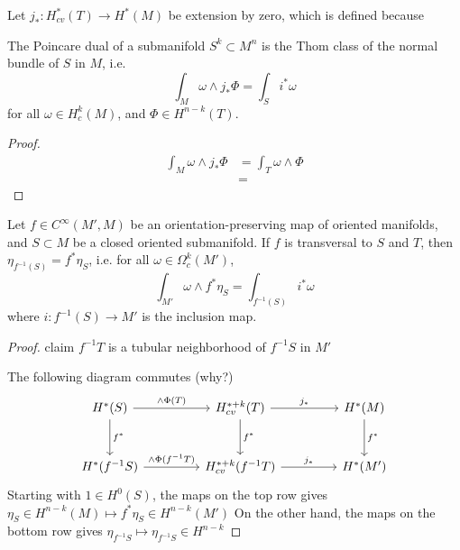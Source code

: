 Let $j_*: H_{cv}^{*}(T) \to H^*(M)$ be extension by zero, which is defined 
because %

\begin{thm} %
	The Poincare dual of a submanifold $S^k \subset M^n$ is the Thom class of the
	normal bundle of $S$ in  $M$, i.e. 
	\[
		\int_M \omega\wedge j_*\Phi = \int_S i^*\omega 
	\] 
	for all $\omega\in H^k_c(M)$, and $\Phi\in H^{n-k}(T)$.
\end{thm}
\begin{proof}
	\begin{align*}
		\int_M \omega\wedge j_*\Phi 
		&= \int_T \omega \wedge \Phi \\
		&=  
	\end{align*}
\end{proof}

\begin{thm} %
	Let $f\in C^\infty(M',M)$ be an orientation-preserving map of oriented
	manifolds, and $S\subset M$ be a closed oriented submanifold. 
	If $f$ is transversal to  $S$ and  $T$, then
	$\eta_{f^{-1}(S)} = f^*\eta_S$, i.e. for all  $\omega\in \Omega^k_c(M')$,
	\[
	\int_{M'} \omega \wedge f^*\eta_S =\int_{f^{-1}(S)} i^*\omega  
	\] 
	where $i: f^{-1}(S) \to M'$ is the inclusion map.
\end{thm}
\begin{proof}
	claim $f^{-1}T$ is a tubular neighborhood of $f^{-1}S$ in $M'$

	The following diagram commutes (why?)
	\[\begin{tikzcd}[row sep=2.85em, column sep=4.45em]
			{H^*(S)} & {H^{*+k}_{cv}(T)} & {H^*(M)} \\
				{H^*(f^{-1}S)} & {H^{*+k}_{cv}(f^{-1}T)} & {H^*(M')}
					\arrow["{f^*}", from=1-1, to=2-1]
						\arrow["{f^*}", from=1-2, to=2-2]
							\arrow["{f^*}", from=1-3, to=2-3]
								\arrow["{\wedge \Phi(T)}", from=1-1, to=1-2]
									\arrow["{j_*}", from=1-2, to=1-3]
										\arrow["{j_*}", from=2-2, to=2-3]
											\arrow["{\wedge \Phi(f^{-1}T)}",
											from=2-1, to=2-2]
	\end{tikzcd}\]
	Starting with $1\in H^0(S)$, the maps on the top row gives 
	$\eta_S \in H^{n-k}(M) \mapsto f^*\eta_S \in H^{n-k}(M')$ 
	On the other hand, the maps on the bottom row gives
	$\eta_{f^{-1}S} \mapsto \eta_{f^{-1}S} \in H^{n-k}$
\end{proof}


